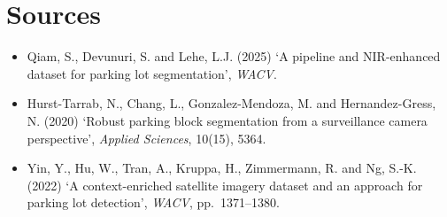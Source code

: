 \hypertarget{sources}{%
\section{Sources}\label{sources}}

\begin{itemize}
\tightlist
\item
  Qiam, S., Devunuri, S. and Lehe, L.J. (2025) `A pipeline and NIR-enhanced dataset for parking lot segmentation', \emph{WACV}.
\item
  Hurst-Tarrab, N., Chang, L., Gonzalez-Mendoza, M. and Hernandez-Gress, N. (2020) `Robust parking block segmentation from a surveillance camera perspective', \emph{Applied Sciences}, 10(15), 5364.
\item
  Yin, Y., Hu, W., Tran, A., Kruppa, H., Zimmermann, R. and Ng, S.-K. (2022) `A context-enriched satellite imagery dataset and an approach for parking lot detection', \emph{WACV}, pp.~1371--1380.
\end{itemize}
